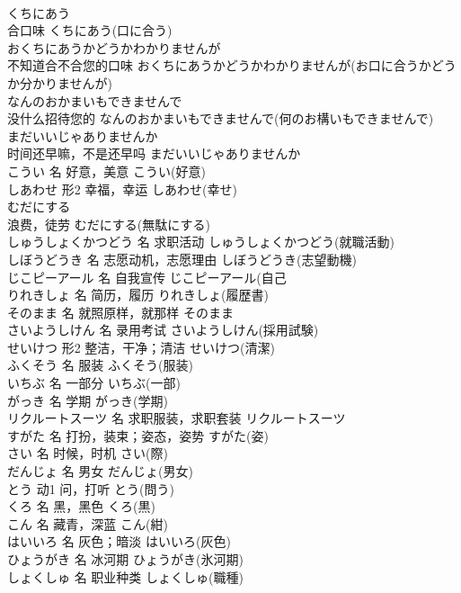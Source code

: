 \documentclass[8pt]{extreport}
\begin{document}
\begin{CJK}{UTF8}{min}
\\	くちにあう	
\\	合口味	くちにあう(口に合う)	
\\	おくちにあうかどうかわかりませんが	
\\	不知道合不合您的口味	おくちにあうかどうかわかりませんが(お口に合うかどうか分かりませんが)	
\\	なんのおかまいもできませんで	
\\	没什么招待您的	なんのおかまいもできませんで(何のお構いもできませんで)	
\\	まだいいじゃありませんか	
\\	时间还早嘛，不是还早吗	まだいいじゃありませんか	
\\	こうい	名	好意，美意	こうい(好意)	
\\	しあわせ	形2	幸福，幸运	しあわせ(幸せ)	
\\	むだにする	
\\	浪费，徒劳	むだにする(無駄にする)	
\\	しゅうしょくかつどう	名	求职活动	しゅうしょくかつどう(就職活動)	
\\	しぼうどうき	名	志愿动机，志愿理由	しぼうどうき(志望動機)	
\\	じこピーアール	名	自我宣传	じこピーアール(自己
\\	りれきしょ	名	简历，履历	りれきしょ(履歴書)	
\\	そのまま	名	就照原样，就那样	そのまま	
\\	さいようしけん	名	录用考试	さいようしけん(採用試験)	
\\	せいけつ	形2	整洁，干净；清洁	せいけつ(清潔)	
\\	ふくそう	名	服装	ふくそう(服装)	
\\	いちぶ	名	一部分	いちぶ(一部)	
\\	がっき	名	学期	がっき(学期)	
\\	リクルートスーツ	名	求职服装，求职套装	リクルートスーツ	
\\	すがた	名	打扮，装束；姿态，姿势	すがた(姿)	
\\	さい	名	时候，时机	さい(際)	
\\	だんじょ	名	男女	だんじょ(男女)	
\\	とう	动1	问，打听	とう(問う)	
\\	くろ	名	黑，黑色	くろ(黒)	
\\	こん	名	藏青，深蓝	こん(紺)	
\\	はいいろ	名	灰色；暗淡	はいいろ(灰色)	
\\	ひょうがき	名	冰河期	ひょうがき(氷河期)	
\\	しょくしゅ	名	职业种类	しょくしゅ(職種)	

\end{CJK}
\end{document}
